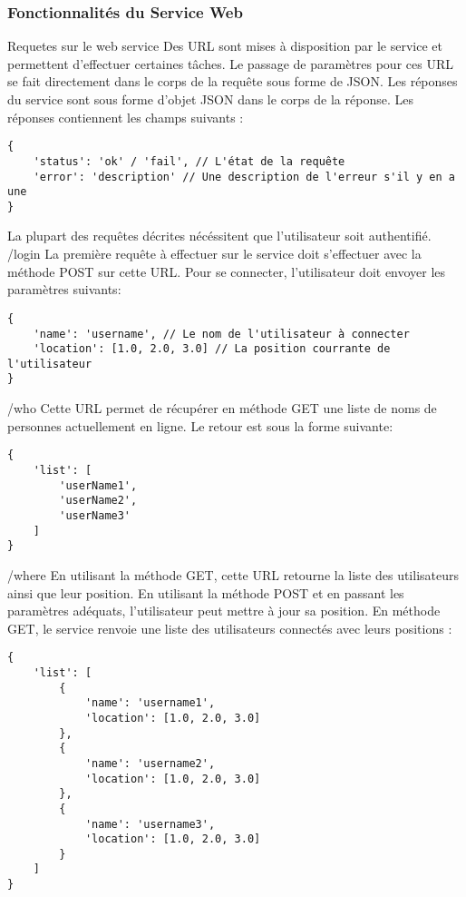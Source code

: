 \subsubsection{Fonctionnalités du Service Web}

Requetes sur le web service
Des URL sont mises à disposition par le service et permettent d'effectuer certaines tâches. Le passage de paramètres pour ces URL se fait directement dans le corps de la requête sous forme de JSON.
Les réponses du service sont sous forme d'objet JSON dans le corps de la réponse. Les réponses contiennent les champs suivants :

\lstset{language=Javascript}
\begin{lstlisting}[caption=Corps de la réponse serveur]
{
    'status': 'ok' / 'fail', // L'état de la requête
    'error': 'description' // Une description de l'erreur s'il y en a une
}
\end{lstlisting}


La plupart des requêtes décrites nécéssitent que l'utilisateur soit authentifié.
/login
La première requête à effectuer sur le service doit s'effectuer avec la méthode POST sur cette URL. Pour se connecter, l'utilisateur doit envoyer les paramètres suivants: 
\lstset{language=Javascript}
\begin{lstlisting}[caption=Corps de la requête login]
{
    'name': 'username', // Le nom de l'utilisateur à connecter
    'location': [1.0, 2.0, 3.0] // La position courrante de l'utilisateur
}
\end{lstlisting}

/who
Cette URL permet de récupérer en méthode GET une liste de noms de personnes actuellement en ligne. Le retour est sous la forme suivante:
\lstset{language=Javascript}
\begin{lstlisting}[caption=Corps de la requête who]
{
    'list': [
        'userName1',
        'userName2',
        'userName3'
    ]
}
\end{lstlisting}

/where
En utilisant la méthode GET, cette URL retourne la liste des utilisateurs ainsi que leur position. En utilisant la méthode POST et en passant les paramètres adéquats, l'utilisateur peut mettre à jour sa position.
En méthode GET, le service renvoie une liste des utilisateurs connectés avec leurs positions :
\lstset{language=Javascript}
\begin{lstlisting}[caption=Corps de la requête where GET]
{
    'list': [
        {
            'name': 'username1',
            'location': [1.0, 2.0, 3.0]
        },
        {
            'name': 'username2',
            'location': [1.0, 2.0, 3.0]
        },
        {
            'name': 'username3',
            'location': [1.0, 2.0, 3.0]
        }
    ]
}
\end{lstlisting}

